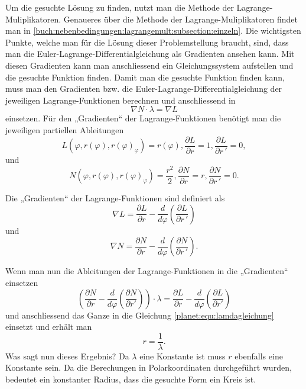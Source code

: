 Um die gesuchte Lösung zu finden, nutzt man die Methode der Lagrange-Muliplikatoren.
Genaueres über die Methode der Lagrange-Muliplikatoren findet man in \cref{buch:nebenbedingungen:lagrangemult:subsection:einzeln}.
Die wichtigsten Punkte, welche man für die Lösung dieser Problemstellung braucht, sind, dass man die Euler-Lagrange-Differentialgleichung als Gradienten ansehen kann.
Mit diesen Gradienten kann man anschliessend ein Gleichungssystem aufstellen und die gesuchte Funktion finden.
Damit man die gesuchte Funktion finden kann, muss man den Gradienten bzw. die Euler-Lagrange-Differentialgleichung der jeweiligen Lagrange-Funktionen berechnen und anschliessend in
\begin{equation}
	\nabla N \cdot \lambda = \nabla L
	\label{planet:equ:lamdagleichung}
\end{equation}
einsetzen.
Für den „Gradienten“ der Lagrange-Funktionen benötigt man die jeweiligen partiellen Ableitungen
\begin{equation*}
	L(\varphi ,r(\varphi),r(\varphi)_\varphi) = r(\varphi),
	\frac{\partial L}{\partial r} = 1,
	\frac{\partial L}{\partial r\,'} = 0,
\end{equation*}
und
\begin{equation*}
	N(\varphi ,r(\varphi),r(\varphi)_\varphi) = \frac{r^2}{2} ,
	\frac{\partial N}{\partial r} = r,
	\frac{\partial N}{\partial r\,'} = 0.
\end{equation*}

\noindent
Die „Gradienten“ der Lagrange-Funktionen sind definiert als 
\begin{equation*}
	\nabla L = 
	\frac{\partial L}{\partial r}-  \frac{d}{d\varphi}\left( \frac{\partial L}{\partial r\,'} \right)
\end{equation*}
und
\begin{equation*}
	\nabla N = \frac{\partial N}{\partial r} - \frac{d}{d\varphi}\left(\frac{\partial N}{\partial r\,'}\right).
\end{equation*}

\noindent
Wenn man nun die Ableitungen der Lagrange-Funktionen in die „Gradienten“ einsetzen
\begin{equation*}
	\left(\frac{\partial N}{\partial r} - \frac{d}{d\varphi}\left(\frac{\partial N}{\partial r'}\right)\right)\cdot \lambda = \frac{\partial L}{\partial r}-  \frac{d}{d\varphi}\left( \frac{\partial L}{\partial r'} \right)
\end{equation*} 
und anschliessend das Ganze in die Gleichung \eqref{planet:equ:lamdagleichung}
einsetzt und erhält man
\begin{equation*}
	r = \frac{1}{\lambda}.
\end{equation*}
Was sagt nun dieses Ergebnis?
Da \(\lambda\) eine Konstante ist muss \(r\) ebenfalls eine Konstante sein.
Da die Berechungen in Polarkoordinaten durchgeführt wurden, bedeutet ein konstanter Radius, dass die gesuchte Form ein Kreis ist.

